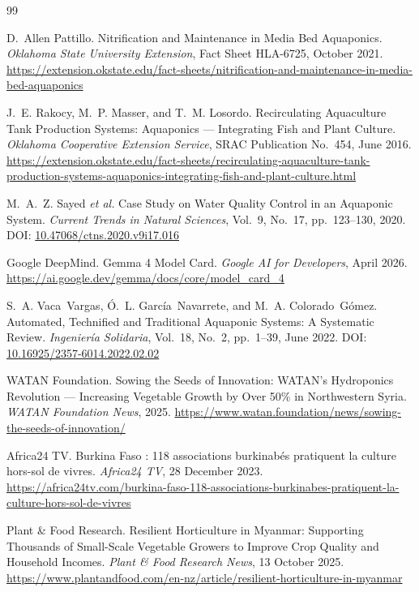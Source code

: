 \documentclass[12pt,a4paper]{article}
\begin{document}
\begin{thebibliography}{99}

D.~Allen Pattillo. Nitrification and Maintenance in Media Bed Aquaponics. \textit{Oklahoma State University Extension}, Fact Sheet HLA-6725, October 2021.
\url{https://extension.okstate.edu/fact-sheets/nitrification-and-maintenance-in-media-bed-aquaponics}

J.~E. Rakocy, M.~P. Masser, and T.~M. Losordo. Recirculating Aquaculture Tank Production Systems: Aquaponics — Integrating Fish and Plant Culture. \textit{Oklahoma Cooperative Extension Service}, SRAC Publication No.~454, June 2016.
\url{https://extension.okstate.edu/fact-sheets/recirculating-aquaculture-tank-production-systems-aquaponics-integrating-fish-and-plant-culture.html}

M.~A.~Z. Sayed \emph{et al.} Case Study on Water Quality Control in an Aquaponic System. \textit{Current Trends in Natural Sciences}, Vol.~9, No.~17, pp.~123--130, 2020.
DOI: \href{https://doi.org/10.47068/ctns.2020.v9i17.016}{10.47068/ctns.2020.v9i17.016}

Google DeepMind. Gemma 4 Model Card. \textit{Google AI for Developers}, April 2026.
\url{https://ai.google.dev/gemma/docs/core/model_card_4}

S.~A. Vaca~Vargas, \'{O}.~L. Garc\'{i}a~Navarrete, and M.~A. Colorado~G\'{o}mez. Automated, Technified and Traditional Aquaponic Systems: A Systematic Review. \textit{Ingenier\'{i}a Solidaria}, Vol.~18, No.~2, pp.~1--39, June 2022.
DOI: \href{https://doi.org/10.16925/2357-6014.2022.02.02}{10.16925/2357-6014.2022.02.02}

WATAN Foundation. Sowing the Seeds of Innovation: WATAN's Hydroponics Revolution — Increasing Vegetable Growth by Over 50\% in Northwestern Syria. \textit{WATAN Foundation News}, 2025.
\url{https://www.watan.foundation/news/sowing-the-seeds-of-innovation/}

Africa24 TV. Burkina Faso : 118 associations burkinab\'{e}s pratiquent la culture hors-sol de vivres. \textit{Africa24 TV}, 28 December 2023.
\url{https://africa24tv.com/burkina-faso-118-associations-burkinabes-pratiquent-la-culture-hors-sol-de-vivres}

Plant \& Food Research. Resilient Horticulture in Myanmar: Supporting Thousands of Small-Scale Vegetable Growers to Improve Crop Quality and Household Incomes. \textit{Plant \& Food Research News}, 13 October 2025.
\url{https://www.plantandfood.com/en-nz/article/resilient-horticulture-in-myanmar}


\end{thebibliography}
\end{document}
